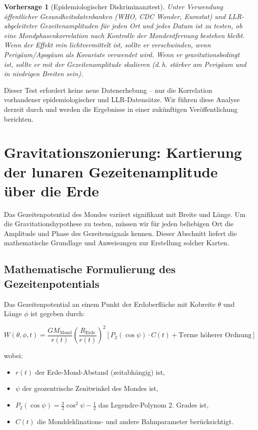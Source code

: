\documentclass[12pt,a4paper]{article}
\newtheorem{prediction}[theorem]{Vorhersage}
\theoremstyle{remark}
\begin{document}
	\begin{prediction}[Epidemiologischer Diskriminanztest]
		Unter Verwendung öffentlicher Gesundheitsdatenbanken (WHO, CDC Wonder, Eurostat) und LLR-abgeleiteter Gezeitenamplituden für jeden Ort und jedes Datum ist zu testen, ob eine Mondphasenkorrelation nach Kontrolle der Mondentfernung bestehen bleibt. Wenn der Effekt rein lichtvermittelt ist, sollte er verschwinden, wenn Perigäum/Apogäum als Kovariate verwendet wird. Wenn er gravitationsbedingt ist, sollte er mit der Gezeitenamplitude skalieren (d. h. stärker am Perigäum und in niedrigen Breiten sein).
	\end{prediction}
	
	Dieser Test erfordert keine neue Datenerhebung – nur die Korrelation vorhandener epidemiologischer und LLR-Datensätze. Wir führen diese Analyse derzeit durch und werden die Ergebnisse in einer zukünftigen Veröffentlichung berichten.
	
	\section{Gravitationszonierung: Kartierung der lunaren Gezeitenamplitude über die Erde}
	\label{sec:map}
	
	Das Gezeitenpotential des Mondes variiert signifikant mit Breite und Länge. Um die Gravitationshypothese zu testen, müssen wir für jeden beliebigen Ort die Amplitude und Phase des Gezeitensignals kennen. Dieser Abschnitt liefert die mathematische Grundlage und Anweisungen zur Erstellung solcher Karten.
	
	\subsection{Mathematische Formulierung des Gezeitenpotentials}
	
	Das Gezeitenpotential an einem Punkt der Erdoberfläche mit Kobreite \(\theta\) und Länge \(\phi\) ist gegeben durch:
	
	\begin{equation}
		W(\theta, \phi, t) = \frac{GM_{\text{Mond}}}{r(t)} \left(\frac{R_{\text{Erde}}}{r(t)}\right)^2 \left[ P_2(\cos\psi) \cdot C(t) + \text{Terme höherer Ordnung} \right]
		\label{eq:tidal-full-map}
	\end{equation}
	
	wobei:
	\begin{itemize}
		\item \(r(t)\) der Erde-Mond-Abstand (zeitabhängig) ist,
		\item \(\psi\) der geozentrische Zenitwinkel des Mondes ist,
		\item \(P_2(\cos\psi) = \frac{3}{2}\cos^2\psi - \frac{1}{2}\) das Legendre-Polynom 2. Grades ist,
		\item \(C(t)\) die Monddeklinations- und andere Bahnparameter berücksichtigt.
	\end{itemize}
	
\end{document}
